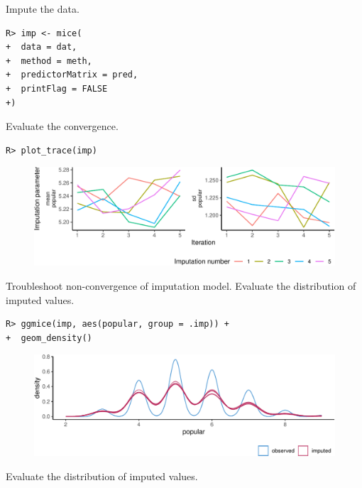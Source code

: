 \documentclass[
  article]{jss}
\begin{document}
Impute the data.

\begin{verbatim}
R> imp <- mice(
+  data = dat,
+  method = meth,
+  predictorMatrix = pred,
+  printFlag = FALSE
+)
\end{verbatim}

Evaluate the convergence.

\begin{verbatim}
R> plot_trace(imp)
\end{verbatim}

\begin{figure}[h]

{\centering \includegraphics{manuscript_files/figure-pdf/unnamed-chunk-18-1.pdf}

}

\end{figure}

Troubleshoot non-convergence of imputation model. Evaluate the
distribution of imputed values.

\begin{verbatim}
R> ggmice(imp, aes(popular, group = .imp)) + 
+  geom_density() 
\end{verbatim}

\begin{figure}[h]

{\centering \includegraphics{manuscript_files/figure-pdf/unnamed-chunk-19-1.pdf}

}

\end{figure}

Evaluate the distribution of imputed values.
\end{document}
